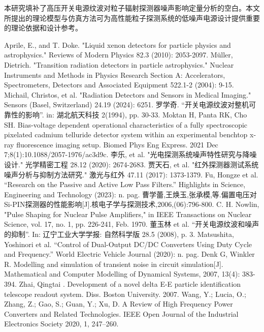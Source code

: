 \documentclass[twocolumn]{ctexart}
\begin{document}
本研究填补了高压开关电源纹波对粒子辐射探测器噪声影响定量分析的空白。本文所提出的理论模型与仿真方法可为高性能粒子探测系统的低噪声电源设计提供重要的理论依据和设计参考。

\begin{thebibliography}{99}
     Aprile, E., and T. Doke. "Liquid xenon detectors for particle physics and astrophysics." Reviews of Modern Physics 82.3 (2010): 2053-2097.
     Müller, Dietrich. "Transition radiation detectors in particle astrophysics." Nuclear Instruments and Methods in Physics Research Section A: Accelerators, Spectrometers, Detectors and Associated Equipment 522.1-2 (2004): 9-15.
     Michail, Christos, et al. "Radiation Detectors and Sensors in Medical Imaging." Sensors (Basel, Switzerland) 24.19 (2024): 6251.
     罗学奇. “开关电源纹波对整机可靠性的影响”. in: 湖北航天科技 2(1994), pp. 30-33.
     Moktan H, Panta RK, Cho SH. Bias-voltage dependent operational characteristics of a fully spectroscopic pixelated cadmium telluride detector system within an experimental benchtop x-ray fluorescence imaging setup. Biomed Phys Eng Express. 2021 Dec 7;8(1):10.1088/2057-1976/ac3d9c.
     李乐, et al. "光电探测系统噪声特性研究与降噪设计." 光学精密工程 28.12 (2020): 2674-2683.
     贾天石, et al. "红外探测器测试系统噪声分析与抑制方法研究." 激光与红外 47.11 (2017): 1373-1379.
     Fu, Hongze et al. “Research on the Passive and Active Low Pass Filters.” Highlights in Science, Engineering and Technology (2023): n. pag.
     曹学蕾,王焕玉,张承模,等.偏置电压对Si-PIN探测器的性能影响[J].核电子学与探测技术,2006,(06):796-800.
     C. H. Nowlin, "Pulse Shaping for Nuclear Pulse Amplifiers," in IEEE Transactions on Nuclear Science, vol. 17, no. 1, pp. 226-241, Feb. 1970.
     董玉林 et al. “开关电源纹波和噪声的抑制”. In: 辽宁工业大学学报: 自然科学版 28.5 (2008), p. 3.
     Matsushita, Yoshinori et al. “Control of Dual-Output DC/DC Converters Using Duty Cycle and Frequency.” World Electric Vehicle Journal (2020): n. pag.
     Denk G, Winkler R. Modelling and simulation of transient noise in circuit simulation[J]. Mathematical and Computer Modelling of Dynamical Systems, 2007, 13(4): 383-394.
     Zhai, Qingtai . Development of a novel delta E-E particle identification telescope readout system. Diss. Boston University. 2007.
     Wang, Y.; Lucia, O.; Zhang, Z.; Gao, S.; Guan, Y.; Xu, D. A Review of High Frequency Power Converters and Related Technologies. IEEE Open Journal of the Industrial Electronics Society 2020, 1, 247–260.
\end{thebibliography}
\end{document}
